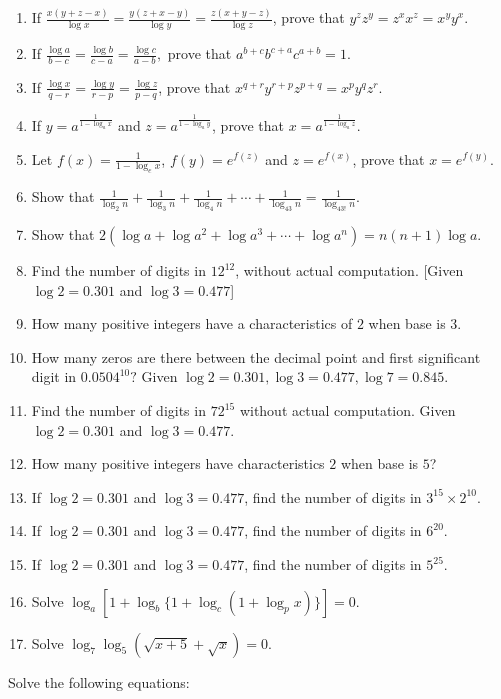 \begin{enumerate}
\item If $\frac{x(y + z - x)}{\log x} = \frac{y(z + x - y)}{\log y} = \frac{z(x + y - z)}{\log z}$, prove that $y^zz^y = z^xx^z =
  x^yy^x$.
\item If $\frac{\log a}{b - c} = \frac{\log b}{c - a} = \frac{\log c}{a - b},$ prove that $a^{b + c}b^{c + a}c^{a + b} = 1$.
\item If $\frac{\log x}{q - r} = \frac{\log y}{r - p} = \frac{\log z}{p - q}$, prove that $x^{q + r}y^{r + p}z^{p + q} =
  x^py^qz^r$.
\item If $y = a^{\frac{1}{1 - \log _ax}}$ and $z = a^{\frac{1}{1 - \log_ay}}$, prove that $x = a^{\frac{1}{1 - \log_az}}$.
\item Let $f(x) = \frac{1}{1 - \log_ex}$, $f(y) = e^{f(z)}$ and $z = e^{f(x)}$, prove that $x = e^{f(y)}$.
\item Show that $\frac{1}{\log_2n} + \frac{1}{\log_3n} + \frac{1}{\log_4n} + \cdots + \frac{1}{\log_{43}n} =
  \frac{1}{\log_{43!}n}$.
\item Show that $2(\log a + \log a^2 + \log a^3 + \cdots + \log a^n) = n(n + 1)\log a$.
\item Find the number of digits in $12^{12}$, without actual computation. [Given $\log 2 = 0.301$ and $\log 3 = 0.477$]
\item How many positive integers have a characteristics of $2$ when base is $3$.
\item How many zeros are there between the decimal point and first significant digit in $0.0504^{10}?$ Given $\log 2 = 0.301, \log
  3 = 0.477, \log 7 = 0.845$.
\item Find the number of digits in $72^{15}$ without actual computation. Given $\log 2 = 0.301$ and $\log  3 = 0.477$.
\item How many positive integers have characteristics $2$ when base is $5$?
\item If $\log 2 = 0.301$ and $\log 3 =0.477$, find the number of digits in $3^{15}\times 2^{10}$.
\item If $\log 2 = 0.301$ and $\log 3 =0.477$, find the number of digits in $6^{20}$.
\item If $\log 2 = 0.301$ and $\log 3 =0.477$, find the number of digits in $5^{25}$.
\item Solve $\log_a[1 + \log_b\{1 + \log_c(1 + \log_px)\}] = 0$.
\item Solve $\log_7\log_5(\sqrt{x + 5} + \sqrt{x}) = 0$.
\end{enumerate}

\noindent Solve the following equations:

